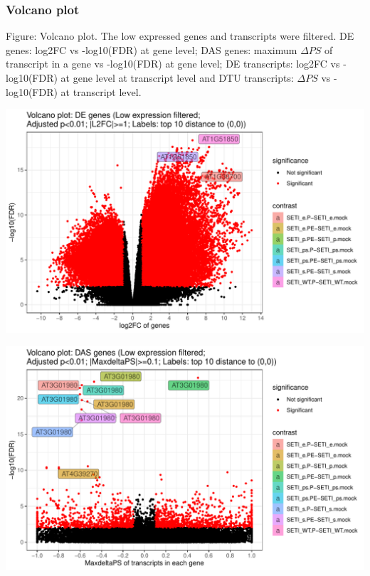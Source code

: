 \documentclass[]{article}
\begin{document}
\subsubsection{Volcano plot}\label{volcano-plot}

Figure: Volcano plot. The low expressed genes and transcripts were
filtered. DE genes: log2FC vs -log10(FDR) at gene level; DAS genes:
maximum \(\Delta PS\) of transcript in a gene vs -log10(FDR) at gene
level; DE transcripts: log2FC vs -log10(FDR) at gene level at transcript
level and DTU transcripts: \(\Delta PS\) vs -log10(FDR) at transcript
level.

\includegraphics[width=16.67in]{X2025.01.13.16.34.12.j145/figure/DE genes volcano plot}

\includegraphics[width=16.67in]{X2025.01.13.16.34.12.j145/figure/DAS genes volcano plot}
\end{document}
